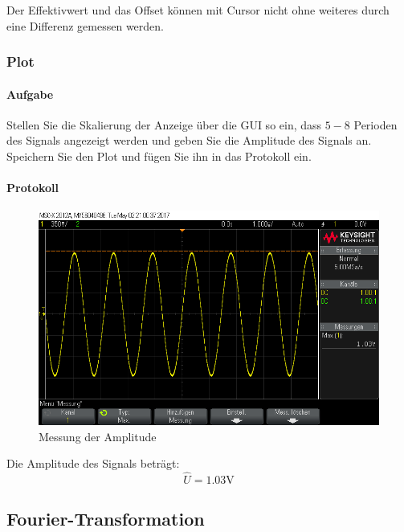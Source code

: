 \documentclass[10pt]{report}
\begin{document}
        \vspace{0.5cm}

         Der Effektivwert und das Offset können mit Cursor nicht ohne weiteres
         durch eine Differenz gemessen werden.

        \subsubsection{Plot}
        \paragraph{Aufgabe}
        Stellen Sie die Skalierung der Anzeige über die GUI so ein, dass $5 - 8$ Perioden des
        Signals angezeigt werden und geben Sie die Amplitude des Signals an. Speichern
        Sie den Plot und fügen Sie ihn in das Protokoll ein.
        \paragraph{Protokoll}
        \begin{center}
            \begin{figure}[H]
                \includegraphics[width=\textwidth]{Screenshot_4113.png}
              \caption{Messung der Amplitude}
            \end{figure}
        \end{center}
        Die Amplitude des Signals beträgt:
        \begin{equation*}
            \hat{U} = 1.03\si{\volt}
        \end{equation*}

        \subsection{Fourier-Transformation}
\end{document}
